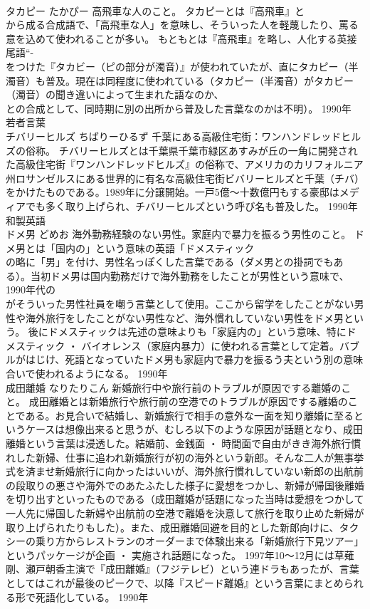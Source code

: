 \documentclass[8pt]{extreport}
\begin{document}
\begin{CJK}{UTF8}{min}
\\	タカピー	たかぴー	高飛車な人のこと。	タカピーとは『高飛車』と
\\	から成る合成語で、「高飛車な人」を意味し、そういった人を軽蔑したり、罵る意を込めて使われることが多い。 もともとは『高飛車』を略し、人化する英接尾語“-
\\	をつけた『タカビー（ピの部分が濁音）』が使われていたが、直にタカピー（半濁音）も普及。現在は同程度に使われている（タカピー（半濁音）がタカビー（濁音）の聞き違いによって生まれた語なのか、
\\	との合成として、同時期に別の出所から普及した言葉なのかは不明）。	1990年	若者言葉	
\\	チバリーヒルズ	ちばりーひるず	千葉にある高級住宅街：ワンハンドレッドヒルズの俗称。	チバリーヒルズとは千葉県千葉市緑区あすみが丘の一角に開発された高級住宅街『ワンハンドレッドヒルズ』の俗称で、アメリカのカリフォルニア州ロサンゼルスにある世界的に有名な高級住宅街ビバリーヒルズと千葉（チバ）をかけたものである。1989年に分譲開始。一戸5億～十数億円もする豪邸はメディアでも多く取り上げられ、チバリーヒルズという呼び名も普及した。	1990年	和製英語	
\\	ドメ男	どめお	海外勤務経験のない男性。家庭内で暴力を振るう男性のこと。	ドメ男とは「国内の」という意味の英語「ドメスティック
\\	の略に「男」を付け、男性名っぽくした言葉である（ダメ男との掛詞でもある）。当初ドメ男は国内勤務だけで海外勤務をしたことが男性という意味で、1990年代の
\\	がそういった男性社員を嘲う言葉として使用。ここから留学をしたことがない男性や海外旅行をしたことがない男性など、海外慣れしていない男性をドメ男という。 後にドメスティックは先述の意味よりも「家庭内の」という意味、特にドメスティック ・ バイオレンス（家庭内暴力）に使われる言葉として定着。バブルがはじけ、死語となっていたドメ男も家庭内で暴力を振るう夫という別の意味合いで使われるようになる。	1990年	
\\	成田離婚	なりたりこん	新婚旅行中や旅行前のトラブルが原因でする離婚のこと。	成田離婚とは新婚旅行や旅行前の空港でのトラブルが原因でする離婚のことである。お見合いで結婚し、新婚旅行で相手の意外な一面を知り離婚に至るというケースは想像出来ると思うが、むしろ以下のような原因が話題となり、成田離婚という言葉は浸透した。結婚前、金銭面 ・ 時間面で自由がきき海外旅行慣れした新婦、仕事に追われ新婚旅行が初の海外という新郎。そんな二人が無事挙式を済ませ新婚旅行に向かったはいいが、海外旅行慣れしていない新郎の出航前の段取りの悪さや海外でのあたふたした様子に愛想をつかし、新婦が帰国後離婚を切り出すといったものである（成田離婚が話題になった当時は愛想をつかして一人先に帰国した新婦や出航前の空港で離婚を決意して旅行を取り止めた新婦が取り上げられたりもした）。また、成田離婚回避を目的とした新郎向けに、タクシーの乗り方からレストランのオーダーまで体験出来る「新婚旅行下見ツアー」というパッケージが企画 ・ 実施され話題になった。 1997年10～12月には草薙剛、瀬戸朝香主演で『成田離婚』（フジテレビ）という連ドラもあったが、言葉としてはこれが最後のピークで、以降『スピード離婚』という言葉にまとめられる形で死語化している。	1990年	

\end{CJK}
\end{document}

